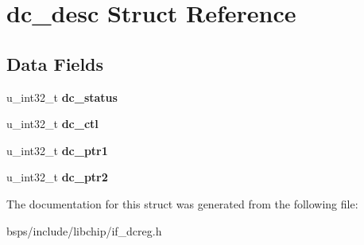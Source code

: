 \hypertarget{structdc__desc}{}\section{dc\+\_\+desc Struct Reference}
\label{structdc__desc}
\subsection*{Data Fields}
\begin{DoxyCompactItemize}
\item 
\mbox{\label{structdc__desc_a95b4a5dd2888fec62434b3453ea62ce1}} 
u\+\_\+int32\+\_\+t {\bfseries dc\+\_\+status}
\item 
\mbox{\label{structdc__desc_addaf220fa44df085d799a62db03f423c}} 
u\+\_\+int32\+\_\+t {\bfseries dc\+\_\+ctl}
\item 
\mbox{\label{structdc__desc_a354fac218af4217eeee2d2e053312dc2}} 
u\+\_\+int32\+\_\+t {\bfseries dc\+\_\+ptr1}
\item 
\mbox{\label{structdc__desc_a0eebc49d2125a9cad7c6211dca6e39d3}} 
u\+\_\+int32\+\_\+t {\bfseries dc\+\_\+ptr2}
\end{DoxyCompactItemize}


The documentation for this struct was generated from the following file\+:\begin{DoxyCompactItemize}
\item 
bsps/include/libchip/if\+\_\+dcreg.\+h\end{DoxyCompactItemize}
